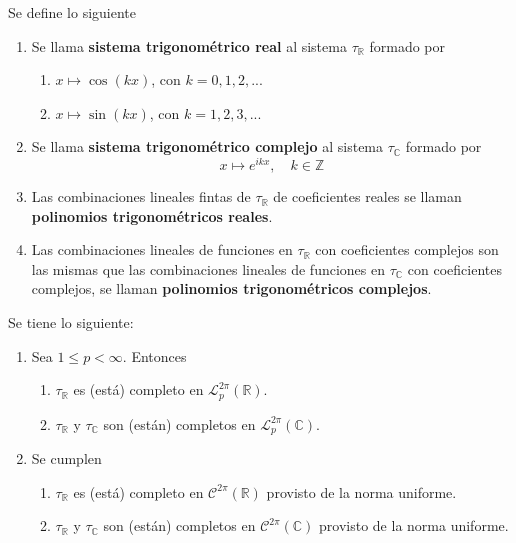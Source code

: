 \documentclass[12pt]{report}
\theoremstyle{largebreak}
\begin{document}
    \begin{mydef}
        Se define lo siguiente
        \begin{enumerate}
            \item Se llama \textbf{sistema trigonométrico real} al sistema $\tau_{\mathbb{R}}$ formado por
            \begin{enumerate}
                \item $x\mapsto\cos(kx)$, con $k=0,1,2,...$
                \item $x\mapsto\sin(kx)$, con $k=1,2,3,...$
            \end{enumerate}
            \item Se llama \textbf{sistema trigonométrico complejo} al sistema $\tau_{\mathbb{C}}$ formado por
            \begin{equation*}
                x\mapsto e^{ikx},\quad k\in\mathbb{Z}
            \end{equation*}
            \item Las combinaciones lineales fintas de $\tau_{\mathbb{R}}$ de coeficientes reales se llaman \textbf{polinomios trigonométricos reales}.
            \item Las combinaciones lineales de funciones en $\tau_{\mathbb{R}}$ con coeficientes complejos son las mismas que las combinaciones lineales de funciones en $\tau_{\mathbb{C}}$ con coeficientes complejos, se llaman \textbf{polinomios trigonométricos complejos}.
        \end{enumerate}
    \end{mydef}

    \begin{theor}
        Se tiene lo siguiente:
        \begin{enumerate}
            \item Sea $1\leq p<\infty$. Entonces
            \begin{enumerate}
                \item $\tau_{\mathbb{R}}$ es (está) completo en $\mathcal{L}_p^{2\pi}(\mathbb{R})$.
                \item $\tau_{\mathbb{R}}$ y $\tau_{\mathbb{C}}$ son (están) completos en $\mathcal{L}_p^{2\pi}(\mathbb{C})$.
            \end{enumerate}
            \item Se cumplen
            \begin{enumerate}
                \item $\tau_{\mathbb{R}}$ es (está) completo en $\mathcal{C}^{2\pi}(\mathbb{R})$ provisto de la norma uniforme.
                \item $\tau_{\mathbb{R}}$ y $\tau_{\mathbb{C}}$ son (están) completos en $\mathcal{C}^{2\pi}(\mathbb{C})$ provisto de la norma uniforme.
            \end{enumerate}
        \end{enumerate}
    \end{theor}
\end{document}
